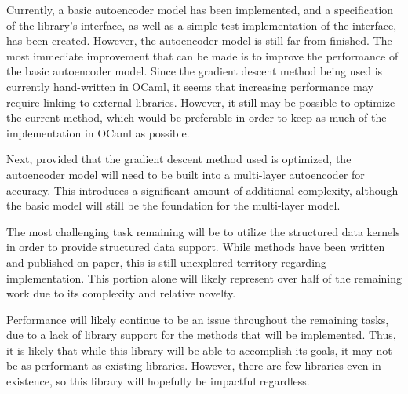 \documentclass{sig-alternate}
\begin{document}
Currently, a basic autoencoder model has been implemented, and a specification of the library's
interface, as well as a simple test implementation of the interface, has been created. 
However, the autoencoder model is still far from finished. The most immediate improvement
that can be made is to improve the performance of the basic autoencoder model. Since the gradient
descent method being used is currently hand-written in OCaml, it seems that increasing 
performance may require linking to external libraries. However, it still may be possible to
optimize the current method, which would be preferable in order to keep as much of the 
implementation in OCaml as possible.

Next, provided that the gradient descent method used is optimized, the autoencoder model will 
need to be built into a multi-layer autoencoder for accuracy. This introduces a significant
amount of additional complexity, although the basic model will still be the foundation for
the multi-layer model. 

The most challenging task remaining will be to utilize the structured data kernels in order to
provide structured data support. While methods have been written and published on paper,
this is still unexplored territory regarding implementation. This portion alone will likely 
represent over half of the remaining work due to its complexity and relative novelty. 

Performance will likely continue to be an issue throughout the remaining tasks, due to a lack
of library support for the methods that will be implemented. Thus, it is likely that while 
this library will be able to accomplish its goals, it may not be as performant as existing 
libraries. However, there are few libraries even in existence, so this library will hopefully
be impactful regardless. 

\vspace{15pt}
\vspace{175pt}
\end{document}
